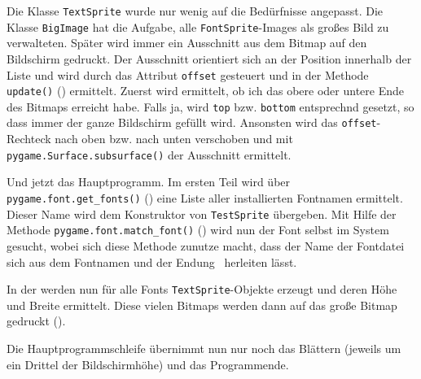 Die Klasse \texttt{TextSprite} wurde nur wenig auf die Bedürfnisse angepasst. Die Klasse \texttt{BigImage} hat  die Aufgabe, alle \texttt{FontSprite}-Images als großes Bild zu verwalteten. Später wird immer ein Ausschnitt aus dem Bitmap auf den Bildschirm gedruckt. Der Ausschnitt orientiert sich an der Position innerhalb der Liste und wird durch das Attribut \texttt{offset} gesteuert und in der Methode \texttt{update()} () ermittelt. Zuerst wird ermittelt, ob ich das obere oder untere Ende des Bitmaps erreicht habe. Falls ja, wird \texttt{top} bzw. \texttt{bottom} entsprechnd gesetzt, so dass immer der ganze Bildschirm gefüllt wird. Ansonsten wird das \texttt{offset}-Rechteck nach oben bzw. nach unten verschoben und mit \texttt{pygame.Surface.subsurface()} der Ausschnitt ermittelt.


Und jetzt das Hauptprogramm. Im ersten Teil wird über \texttt{pygame.font.get\_fonts()} () eine Liste aller installierten Fontnamen ermittelt. Dieser Name wird dem Konstruktor von \texttt{TestSprite} übergeben. Mit Hilfe der Methode \texttt{pygame.font.match\_font()} () wird nun der Font selbst im System gesucht, wobei sich diese Methode zunutze macht, dass der Name der Fontdatei sich aus dem Fontnamen und der Endung~ herleiten lässt.

{} 

In der \forSchleife{} werden nun für alle Fonts \texttt{TextSprite}-Objekte erzeugt und deren Höhe und Breite ermittelt. Diese vielen Bitmaps werden dann auf das große Bitmap gedruckt ().


Die Hauptprogrammschleife übernimmt nun nur noch das Blättern (jeweils um ein Drittel der Bildschirmhöhe) und das Programmende.

